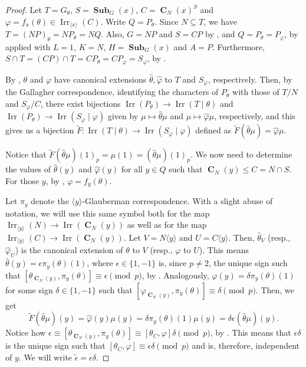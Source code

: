 \documentclass[12pt]{amsart}
\DeclareMathOperator{\CB}{\mathbf{C}}
\DeclareMathOperator{\Sub}{\mathbf{Sub}}
\DeclareMathOperator{\Irr}{Irr}
\theoremstyle{remark}
\theoremstyle{definition}
\theoremstyle{plain}
\theoremstyle{definition}
\numberwithin{equation}{section}
\begin{document}
\begin{proof}
	Let $T = G_\theta$, $S = \Sub_G(x)$, $C = \CB_N(x)^S$ and $\varphi = f_x(\theta) \in \Irr_{\langle x \rangle}(C)$. Write $Q = P_\theta$. Since $N \subseteq T$, we have $T = (NP)_\theta = NP_\theta = NQ$. Also, $G = NP$ and $S = CP$ by , and $Q = P_\theta = P_\varphi$, by  applied with $L = 1$, $K = N$, $H = \Sub_G(x)$ and $A = P$. Furthermore, $S \cap T = (CP) \cap T = CP_\theta = CP_\varphi = S_\varphi$, by .
	
	By \cite[Corollary 6.28]{CTFG}, $\theta$ and $\varphi$ have canonical extensions $\widehat{\theta}, \widehat{\varphi}$ to $T$ and $S_\varphi$, respectively. Then, by the Gallagher correspondence, identifying the characters of $P_\theta$ with those of $T/N$ and $S_\varphi/C$, there exist bijections $\Irr(P_\theta) \to \Irr(T\mid \theta)$ and $\Irr(P_\theta) \to \Irr(S_\varphi\mid \varphi)$ given by $\mu \mapsto \widehat{\theta}\mu$ and $\mu \mapsto \widehat{\varphi}\mu$, respectively, and this gives us a bijection $\tilde{F}: \Irr(T\mid \theta) \to \Irr(S_\varphi \mid \varphi)$ defined as $\tilde{F}(\widehat{\theta}\mu) = \widehat{\varphi}\mu$. 
	
	Notice that $\tilde{F}(\widehat{\theta}\mu)(1)_p = \mu(1) = (\widehat{\theta}\mu)(1)_p$. We now need to determine the values of $\widehat{\theta}(y)$ and $\widehat{\varphi}(y)$ for all $y \in Q$ such that $\CB_N(y) \leq C = N \cap S$. For those $y$, by , $\varphi = f_y(\theta)$.
	
	Let $\pi_y$ denote the $\langle y \rangle$-Glauberman correspondence. With a slight abuse of notation, we will use this same symbol both for the map $\Irr_{\langle y \rangle}(N) \to \Irr(\CB_N(y))$ as well as for the map $\Irr_{\langle y \rangle}(C) \to \Irr(\CB_N(y))$. Let $V = N\langle y \rangle$ and $U = C\langle y \rangle$. Then, $\widehat{\theta}_V$ (resp., $\widehat{\varphi}_U$) is the canonical extension of $\theta$ to $V$ (resp., $\varphi$ to $U$). This means $\widehat{\theta}(y) = \epsilon \pi_y(\theta)(1)$, where $\epsilon \in \{1, -1\}$ is, since $p \neq 2$, the unique sign such that $[\theta_{\CB_N(y)}, \pi_y(\theta)] \equiv \epsilon \pmod{p}$, by \cite[Theorem 13.6]{CTFG}. Analogously, $\widehat{\varphi}(y) = \delta \pi_y(\theta)(1)$ for some sign $\delta \in \{1, -1\}$ such that $[\varphi_{\CB_N(y)}, \pi_y(\theta)] \equiv \delta \pmod{p}$. Then, we get
	\begin{equation*}
		\tilde{F}(\widehat{\theta}\mu)(y) = \widehat{\varphi}(y)\mu(y) = \delta\pi_y(\theta)(1) \mu(y) = \delta\epsilon(\widehat{\theta}\mu)(y).
	\end{equation*}
	Notice how $\epsilon \equiv [\theta_{\CB_N(y)}, \pi_y(\theta)] \equiv [\theta_C, \varphi]\delta \pmod{p}$, by . This means that $\epsilon \delta$ is the unique sign such that $[\theta_C, \varphi] \equiv \epsilon\delta \pmod{p}$ and is, therefore, independent of $y$. We will write $\tilde{\epsilon} = \epsilon \delta$.
	

\end{proof}
\end{document}
